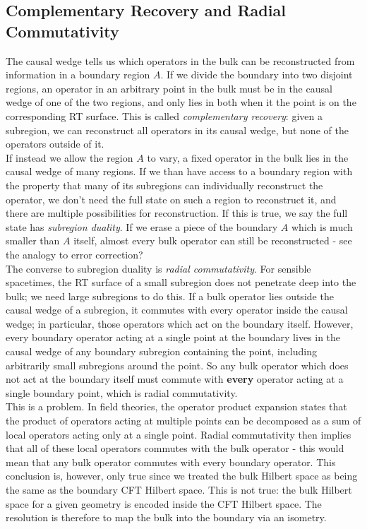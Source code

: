 \documentclass[12pt,a4paper]{report}
\numberwithin{equation}{section}
\theoremstyle{definition}
\theoremstyle{theorem}
\theoremstyle{theorem}
\theoremstyle{example}
\theoremstyle{definition}
\begin{document}
\subsection{Complementary Recovery and Radial Commutativity}
The causal wedge tells us which operators in the bulk can be reconstructed from information in a boundary region $A$. If we divide the boundary into two disjoint regions, an operator in an arbitrary point in the bulk must be in the causal wedge of one of the two regions, and only lies in both when it the point is on the corresponding RT surface. This is called \textit{complementary recovery}: given a subregion, we can reconstruct all operators in its causal wedge, but none of the operators outside of it.\\
If instead we allow the region $A$ to vary, a fixed operator in the bulk lies in the causal wedge of many regions. If we than have access to a boundary region with the property that many of its subregions can individually reconstruct the operator, we don't need the full state on such a region to reconstruct it, and there are multiple possibilities for reconstruction. If this is true, we say the full state has \textit{subregion duality}. If we erase a piece of the boundary $A$ which is much smaller than $A$ itself, almost every bulk operator can still be reconstructed - see the analogy to error correction?\\
The converse to subregion duality is \textit{radial commutativity}. For sensible spacetimes, the RT surface of a small subregion does not penetrate deep into the bulk; we need large subregions to do this. If a bulk operator lies outside the causal wedge of a subregion, it commutes with every operator inside the causal wedge; in particular, those operators which act on the boundary itself. However, every boundary operator acting at a single point at the boundary lives in the causal wedge of any boundary subregion containing the point, including arbitrarily small subregions around the point. So any bulk operator which does not act at the boundary itself must commute with \textbf{every} operator acting at a single boundary point, which is radial commutativity.\\
This is a problem. In field theories, the operator product expansion states that the product of operators acting at multiple points can be decomposed as a sum of local operators acting only at a single point. Radial commutativity then implies that all of these local operators commutes with the bulk operator - this would mean that any bulk operator commutes with every boundary operator. This conclusion is, however, only true since we treated the bulk Hilbert space as being the same as the boundary CFT Hilbert space. This is not true: the bulk Hilbert space for a given geometry is encoded inside the CFT Hilbert space. The resolution is therefore to map the bulk into the boundary via an isometry.
\end{document}
